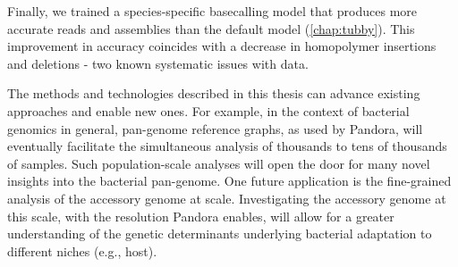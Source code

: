 Finally, we trained a species-specific \ont{} basecalling model that produces more accurate \mtb{} reads and assemblies than the default model (\autoref{chap:tubby}). This improvement in accuracy coincides with a decrease in homopolymer insertions and deletions - two known systematic issues with \ont{} data.


\hspace{0.5cm} 

\noindent
The methods and technologies described in this thesis can advance existing approaches and enable new ones. For example, in the context of bacterial genomics in general, pan-genome reference graphs, as used by Pandora, will eventually facilitate the simultaneous analysis of thousands to tens of thousands of samples. Such population-scale analyses will open the door for many novel insights into the bacterial pan-genome. One future application is the fine-grained analysis of the accessory genome at scale. Investigating the accessory genome at this scale, with the resolution Pandora enables, will allow for a greater understanding of the genetic determinants underlying bacterial adaptation to different niches (e.g., host).



